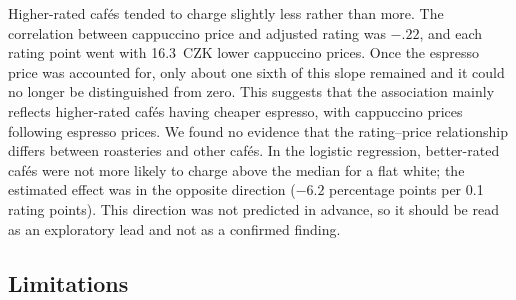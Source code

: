 \documentclass[11pt,a4paper]{article}
\begin{document}
Higher-rated caf\'es tended to charge slightly less rather than more. The correlation between cappuccino price and adjusted rating was $-.22$, and each rating point went with 16.3~CZK lower cappuccino prices. Once the espresso price was accounted for, only about one sixth of this slope remained and it could no longer be distinguished from zero. This suggests that the association mainly reflects higher-rated caf\'es having cheaper espresso, with cappuccino prices following espresso prices. We found no evidence that the rating--price relationship differs between roasteries and other caf\'es. In the logistic regression, better-rated caf\'es were not more likely to charge above the median for a flat white; the estimated effect was in the opposite direction ($-6.2$ percentage points per 0.1 rating points). This direction was not predicted in advance, so it should be read as an exploratory lead and not as a confirmed finding.

\subsection{Limitations}
\end{document}
